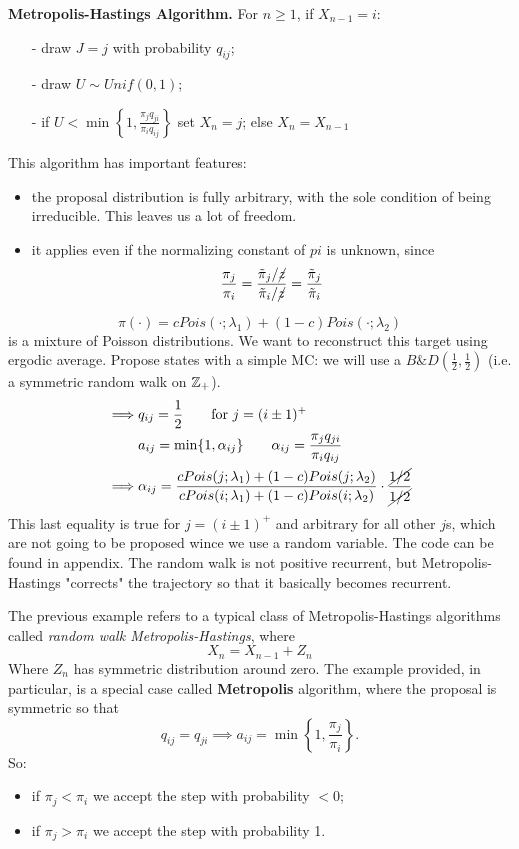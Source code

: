 \documentclass{article}
\begin{document}
	\begin{algorithm}
		\textbf{Metropolis-Hastings Algorithm.} For $n\geqslant1$, if $X_{n-1}=i$:
		\begin{itemize}
			\item [-] draw $J=j$ with probability $q_{ij}$;
			\item [-] draw $U\sim Unif(0,1)$;
			\item [-] if $U<\min\left\{1,\frac{\pi_jq_{ji}}{\pi_iq_{ij}}\right\}$ set $X_n=j$; else $X_n=X_{n-1}$
		\end{itemize}
	\end{algorithm}
	This algorithm has important features:
	\begin{itemize}
		\item the proposal distribution is fully arbitrary, with the sole condition of being irreducible. This leaves us a lot of freedom.
		\item it applies even if the normalizing constant of $pi$ is unknown, since
		\[
		\frac{\pi_j}{\pi_i}=\frac{\tilde{\pi}_j/\cancel{z}}{\tilde{\pi}_i/\cancel{z}}=\frac{\tilde{\pi}_j}{\tilde{\pi}_i}
		\]
	\end{itemize}
	\begin{example}
		\[
		\pi(\cdot)=cPois(\cdot;\lambda_1)+(1-c)Pois(\cdot;\lambda_2)
		\]
		is a mixture of Poisson distributions. We want to reconstruct this target using ergodic average. Propose states with a simple MC: we will use a $B\&D\left(\frac{1}{2},\frac{1}{2}\right)$ (i.e. a symmetric random walk on $\mathbb{Z}_+$).
		\begin{align*}
			\implies &q_{ij}=\frac{1}{2}\qquad\text{for }j=(i\pm1)^+\\
			& a_{ij}=\min\{1,\alpha_{ij}\}\qquad\alpha_{ij}=\frac{\pi_jq_{ji}}{\pi_iq_{ij}}\\
			\implies &\alpha_{ij}=\frac{cPois(j;\lambda_1)+(1-c)Pois(j;\lambda_2)}{cPois(i;\lambda_1)+(1-c)Pois(i;\lambda_2)}\cdot\frac{\cancel{1/2}}{\cancel{1/2}}
		\end{align*} This last equality is true for $j=(i\pm1)^+$ and arbitrary for all other $j$s, which are not going to be proposed wince we use a random variable. The code can be found in appendix. %
		The random walk is not positive recurrent, but Metropolis-Hastings "corrects" the trajectory so that it basically becomes recurrent.
	\end{example}
	The previous example refers to a typical class of Metropolis-Hastings algorithms called \textit{random walk Metropolis-Hastings}, where
	\[
	X_n=X_{n-1}+Z_n
	\]
	Where $Z_n$ has symmetric distribution around zero. The example provided, in particular, is a special case called \textbf{Metropolis} algorithm, where the proposal is symmetric so that
	\[
	q_{ij}=q_{ji}\implies a_{ij}=\min\left\{1,\frac{\pi_j}{\pi_i}\right\}.
	\]
	So:
	\begin{itemize}
		\item if $\pi_j<\pi_i$ we accept the step with probability $<0$;
		\item if $\pi_j>\pi_i$ we accept the step with probability 1.
	\end{itemize}
	
\end{document}
